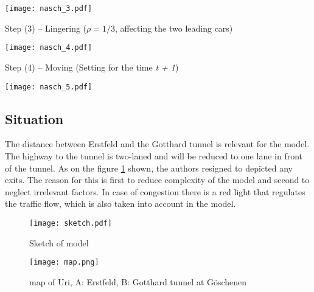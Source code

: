 \texttt{[image: nasch\_3.pdf]}\vspace*{1cm}

Step (3) -- Lingering ($\rho = 1/3$, affecting the two leading cars)\\ \vspace{-.2cm}

\texttt{[image: nasch\_4.pdf]}\vspace*{1cm}

Step (4) -- Moving (Setting for the time \textit{t + 1})\\ \vspace{-.2cm}

\texttt{[image: nasch\_5.pdf]}



\subsection{Situation}
The distance between Erstfeld and the Gotthard tunnel is relevant for the model. The highway to the tunnel is two-laned and will be reduced to one lane in front of the tunnel. As on the figure \ref{sketch} shown, the authors resigned to depicted any exits. The reason for this is first to reduce complexity of the model and second to neglect irrelevant factors. In case of congestion there is a red light that regulates the traffic flow, which is also taken into account in the model. 

\begin{figure}[h]\centering
\texttt{[image: sketch.pdf]}
\caption{Sketch of model}
\label{sketch}
\end{figure}

\begin{figure}[h]\centering
\texttt{[image: map.png]}
\caption{map of Uri, A: Erstfeld, B: Gotthard tunnel at Göschenen}
\label{map}
\end{figure}